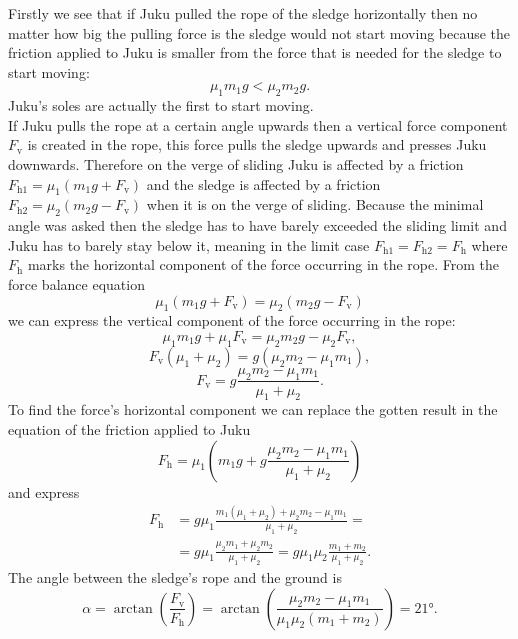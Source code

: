 \documentclass[11pt]{article}
\begin{document}
\solueng
Firstly we see that if Juku pulled the rope of the sledge horizontally then no matter how big the pulling force is the sledge would not start moving because the friction applied to Juku is smaller from the force that is needed for the sledge to start moving:
\[
\mu_1 m_1 g < \mu_2 m_2 g.
\]
Juku’s soles are actually the first to start moving.\\
If Juku pulls the rope at a certain angle upwards then a vertical force component $F_{\mathrm{v}}$ is created in the rope, this force pulls the sledge upwards and presses Juku downwards. Therefore on the verge of sliding Juku is affected by a friction $F_{\mathrm{h}1} = \mu_1 \left(m_1 g + F_{\mathrm{v}}\right)$ and the sledge is affected by a friction $F_{\mathrm{h}2} = \mu_2 \left(m_2 g - F_{\mathrm{v}}\right)$ when it is on the verge of sliding. Because the minimal angle was asked then the sledge has to have barely exceeded the sliding limit and Juku has to barely stay below it, meaning in the limit case $F_{\mathrm{h}1} = F_{\mathrm{h}2} = F_{\mathrm{h}}$ where $F_{\mathrm{h}}$ marks the horizontal component of the force occurring in the rope. From the force balance equation
\begin{equation*}
\mu_1 \left(m_1 g + F_{\mathrm{v}}\right) = \mu_2 \left(m_2 g - F_{\mathrm{v}}\right)
\end{equation*}
we can express the vertical component of the force occurring in the rope:
\begin{equation*}
\mu_1 m_1 g + \mu_1 F_{\mathrm{v}} = \mu_2 m_2 g - \mu_2 F_{\mathrm{v}},
\end{equation*}
\begin{equation*}
F_{\mathrm{v}} \left(\mu_1 + \mu_2\right) = g\left(\mu_2 m_2 - \mu_1 m_1\right),
\end{equation*}
\begin{equation*}
F_{\mathrm{v}} = g\frac{\mu_2 m_2 - \mu_1 m_1}{\mu_1 + \mu_2}.
\end{equation*}
To find the force’s horizontal component we can replace the gotten result in the equation of the friction applied to Juku
\begin{equation*}
F_{\mathrm{h}} = \mu_1 \left(m_1 g + g\frac{\mu_2 m_2 - \mu_1 m_1}{\mu_1 + \mu_2}\right)
\end{equation*}
and express
\begin{align*}
F_{\mathrm{h}} &= g \mu_1 \frac{m_1 \left(\mu_1 + \mu_2\right) + \mu_2 m_2 - \mu_1 m_1}{\mu_1 + \mu_2} = \\
&= g \mu_1 \frac{\mu_2 m_1 + \mu_2 m_2}{\mu_1 + \mu_2} = g\mu_1\mu_2\frac{m_1+m_2}{\mu_1+\mu_2}.
\end{align*}
The angle between the sledge’s rope and the ground is
\begin{equation*}
\alpha = \arctan\left(\frac{F_{\mathrm{v}}}{F_{\mathrm{h}}}\right) = \arctan\left(\frac{\mu_2 m_2 - \mu_1 m_1}{\mu_1 \mu_2 \left(m_1 + m_2\right)}\right) = \ang{21}.
\end{equation*}
\probend
\bigskip
\end{document}
